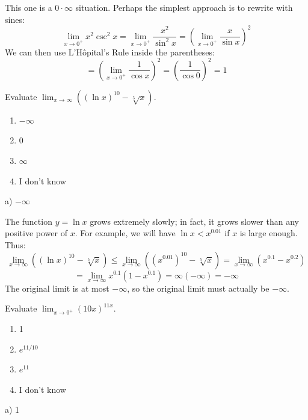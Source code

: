 \documentclass[addpoints,12pt,answers]{exam}
\begin{document}
\begin{questions}
\begin{solution}
    This one is a $0\cdot\infty$ situation. Perhaps the simplest approach is to rewrite with sines:
    $$\lim_{x\to 0^+}x^2\csc^2 x=\lim_{x\to 0^+}\frac{x^2}{\sin^2 x}=\left(\lim_{x\to 0^+}\frac{x}{\sin x}\right)^2$$
    We can then use L'H\^{o}pital's Rule inside the parentheses:
    $$=\left(\lim_{x\to 0^+}\frac{1}{\cos x}\right)^2=\left(\frac{1}{\cos 0}\right)^2=1$$
  \end{solution}
  \newpage
  \question
  Evaluate $\displaystyle\lim_{x\to\infty}((\ln x)^{10}-\sqrt[5]{x})$.
  \begin{enumerate}[label=\alph*)]
    \item
    $-\infty$
    \item
    0
    \item
    $\infty$
    \item
    I don't know
  \end{enumerate}
  \begin{solution}
    a) $-\infty$
    
    The function $y=\ln x$ grows extremely slowly; in fact, it grows slower than any positive power of $x$. For example, we will have $\ln x<x^{0.01}$ if $x$ is large enough. Thus:
    $$\lim_{x\to\infty}((\ln x)^{10}-\sqrt[5]{x})\le\lim_{x\to\infty}((x^{0.01})^{10}-\sqrt[5]{x})=\lim_{x\to\infty}(x^{0.1}-x^{0.2})$$
    $$=\lim_{x\to\infty} x^{0.1}(1-x^{0.1})=\infty(-\infty)=-\infty$$
    The original limit is at most $-\infty$, so the original limit must actually be $-\infty$.
  \end{solution}
  \newpage
  \question
  Evaluate $\displaystyle\lim_{x\to 0^+}(10x)^{11x}$.
  \begin{enumerate}[label=\alph*)]
    \item
    1
    \item
    $e^{11/10}$
    \item
    $e^{11}$
    \item
    I don't know
  \end{enumerate}
  \begin{solution}
    a) 1
    

\end{solution}
\end{questions}
\end{document}
